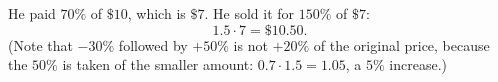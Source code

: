 He paid $70\%$ of $\$10$, which is $\$7$. He sold it for $150\%$ of $\$7$:
\[1.5\cdot7=\boxed{\$10.50}.\]
(Note that $-30\%$ followed by $+50\%$ is not $+20\%$ of the original price, because the $50\%$ is taken of the smaller amount: $0.7\cdot1.5=1.05$, a $5\%$ increase.)
